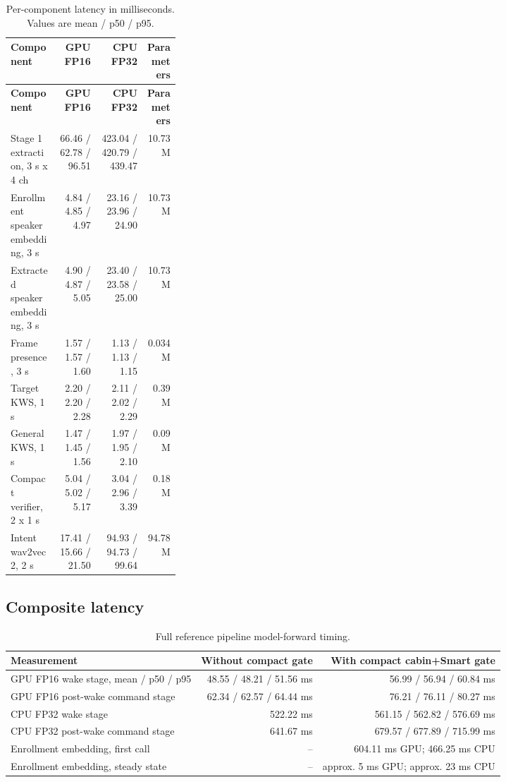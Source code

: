 \documentclass[11pt,a4paper]{article}
\begin{document}
\begin{longtable}{@{}p{0.28\linewidth}rrr@{}}
\caption{Per-component latency in milliseconds. Values are mean / p50 / p95.}
\label{tab:component-latency}\\
\toprule
\textbf{Component} & \textbf{GPU FP16} & \textbf{CPU FP32} & \textbf{Parameters}\\
\midrule
\endfirsthead
\toprule
\textbf{Component} & \textbf{GPU FP16} & \textbf{CPU FP32} & \textbf{Parameters}\\
\midrule
\endhead
Stage 1 extraction, 3 s x 4 ch & 66.46 / 62.78 / 96.51 & 423.04 / 420.79 / 439.47 & 10.73 M\\
Enrollment speaker embedding, 3 s & 4.84 / 4.85 / 4.97 & 23.16 / 23.96 / 24.90 & 10.73 M\\
Extracted speaker embedding, 3 s & 4.90 / 4.87 / 5.05 & 23.40 / 23.58 / 25.00 & 10.73 M\\
Frame presence, 3 s & 1.57 / 1.57 / 1.60 & 1.13 / 1.13 / 1.15 & 0.034 M\\
Target KWS, 1 s & 2.20 / 2.20 / 2.28 & 2.11 / 2.02 / 2.29 & 0.39 M\\
General KWS, 1 s & 1.47 / 1.45 / 1.56 & 1.97 / 1.95 / 2.10 & 0.09 M\\
Compact verifier, 2 x 1 s & 5.04 / 5.02 / 5.17 & 3.04 / 2.96 / 3.39 & 0.18 M\\
Intent wav2vec2, 2 s & 17.41 / 15.66 / 21.50 & 94.93 / 94.73 / 99.64 & 94.78 M\\
\bottomrule
\end{longtable}

\subsection{Composite latency}

\begin{table}[H]
\centering
\caption{Full reference pipeline model-forward timing.}
\label{tab:composite-latency}
\small
\begin{tabular}{@{}lrr@{}}
\toprule
\textbf{Measurement} & \textbf{Without compact gate} & \textbf{With compact cabin+Smart gate}\\
\midrule
GPU FP16 wake stage, mean / p50 / p95 & 48.55 / 48.21 / 51.56 ms & 56.99 / 56.94 / 60.84 ms\\
GPU FP16 post-wake command stage & 62.34 / 62.57 / 64.44 ms & 76.21 / 76.11 / 80.27 ms\\
CPU FP32 wake stage & 522.22 ms & 561.15 / 562.82 / 576.69 ms\\
CPU FP32 post-wake command stage & 641.67 ms & 679.57 / 677.89 / 715.99 ms\\
Enrollment embedding, first call & -- & 604.11 ms GPU; 466.25 ms CPU\\
Enrollment embedding, steady state & -- & approx. 5 ms GPU; approx. 23 ms CPU\\
\bottomrule
\end{tabular}
\end{table}
\end{document}
